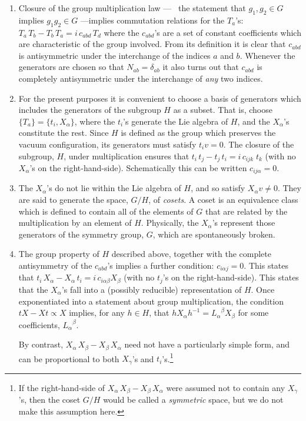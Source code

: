 \documentclass[12pt,epsf]{report}
\begin{document}
\begin{enumerate}
\item
Closure of the group multiplication law --- \ie\ the statement
that $g_1, g_2 \in G$ implies $g_1 g_2 \in G$ ---implies
commutation relations for the $T_a$'s: $T_a \,T_b - 
T_b \, T_a = i \, c_{abd} 
\, T_d$ where the $c_{abd}$'s are a set of constant
coefficients which are characteristic of the group
involved. From its definition it is clear that $c_{abd}$ is
antisymmetric under the interchange of the indices $a$ and
$b$. Whenever the generators are chosen so that $N_{ab} =
\delta_{ab}$ it also turns out that $c_{abd}$ is completely
antisymmetric under the interchange of {\em any} two indices.

\item
For the present purposes it is convenient to choose a basis
of generators which includes the generators of the subgroup
$H$ as a subset. That is, choose $\{ T_a \} = \{ t_i,
X_\alpha \}$, where the $t_i$'s generate the Lie algebra of
$H$, and the $X_\alpha$'s constitute the rest. Since $H$ is
defined as the group which preserves the vacuum
configuration, its generators must satisfy $t_i v = 0$. The
closure of the subgroup, $H$, under multiplication ensures
that $t_i \, t_j - t_j \, t_i = i \, c_{ijk} \; t_k$ (with
no $X_\alpha$'s on the right-hand-side). Schematically this
can be written $c_{ij\alpha} = 0$.

\item
The $X_\alpha$'s do not lie within the Lie algebra of $H$,
and so satisfy $X_\alpha v \neq 0$. They are said to
generate the space, $G/H$, of {\em cosets}. A coset is an
equivalence class which is defined to contain all of the
elements of $G$ that are related by the multiplication by
an element of $H$. Physically, the $X_\alpha$'s represent
those generators of the symmetry group, $G$, which are
spontaneously broken.

\item
The group property of $H$ described above, together with
the complete antisymmetry of the $c_{abd}$'s implies a
further condition: $c_{i\alpha j} = 0$. This states that
$t_i \, X_\alpha - X_\alpha \, t_i = i \, c_{i \alpha
\beta} X_\beta$ (with no $t_j$'s on the right-hand-side).
This states that the $X_\alpha$'s fall into a (possibly
reducible) representation of $H$. Once exponentiated into a
statement about group multiplication, the condition $tX - Xt
\propto X$ implies,  for any $h \in H$, that $h X_\alpha
h^{-1} = {L_\alpha}^\beta X_\beta$ for some coefficients,
${L_\alpha
}^\beta$.

By contrast, $X_\alpha \,X_\beta - X_\beta \, X_\alpha$
need not have a particularly simple form, and can be
proportional to both $X_\gamma$'s and $t_i$'s.\footnote{If
the right-hand-side of $X_\alpha \,X_\beta - X_\beta \,
X_\alpha$ were assumed not to contain any  $X_\gamma$'s,
then the coset $G/H$ would be called a {\em symmetric}
space, but we do not make this assumption here.}

\end{enumerate}
\end{document}
